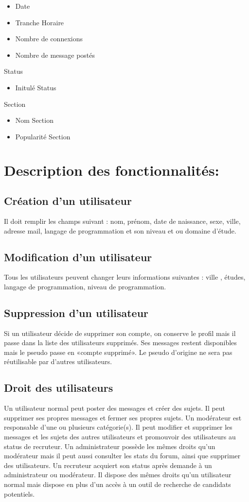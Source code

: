 \documentclass{report}
\begin{document}
  \begin{itemize}
		\item Date
		\item Tranche Horaire
		\item Nombre de connexions
		\item Nombre de message postés
    \end{itemize}
	Status
  \begin{itemize}
		\item Initulé Status
    \end{itemize}
	Section
  \begin{itemize}
		\item Nom Section
		\item Popularité Section
  \end{itemize}


\section{Description des fonctionnalités:}

\subsection{Création d'un utilisateur}
		Il doit remplir les champs suivant : nom, prénom, date 	de naissance, sexe, ville, adresse mail, langage de 			programmation et son niveau et ou domaine d’étude.

\subsection{Modification d’un utilisateur}
		Tous les utilisateurs peuvent changer leurs informations 	suivantes : ville , études, langage de programmation, niveau 	de programmation.

\subsection{Suppression d’un utilisateur}
		Si un utilisateur décide de supprimer son compte, on 	conserve le profil mais il passe dans la liste des 	utilisateurs 	supprimés. Ses messages restent disponibles mais le 	pseudo 	passe en «compte supprimé». Le pseudo d'origine ne 	sera pas 	réutilisable par d'autres utilisateurs.
\subsection{Droit des utilisateurs}
		Un utilisateur normal peut poster des messages et    	créer des sujets. Il peut supprimer ses propres messages et 	fermer ses propres sujets.
		Un modérateur est responsable d’une ou plusieurs 	catégorie(s). Il peut modifier et supprimer les 			messages et les sujets des autres utilisateurs et 			promouvoir des utilisateurs au status de recruteur.
		Un administrateur possède les mêmes droits qu'un 	modérateur mais il peut aussi consulter les stats du 		forum, ainsi que supprimer des utilisateurs.
		Un recruteur acquiert son status après demande à un 	administrateur ou modérateur. Il dispose des mêmes 	droits 	qu'un utilisateur normal mais dispose en plus d'un accès à un 	outil de recherche de candidats potentiels.
\end{document}
